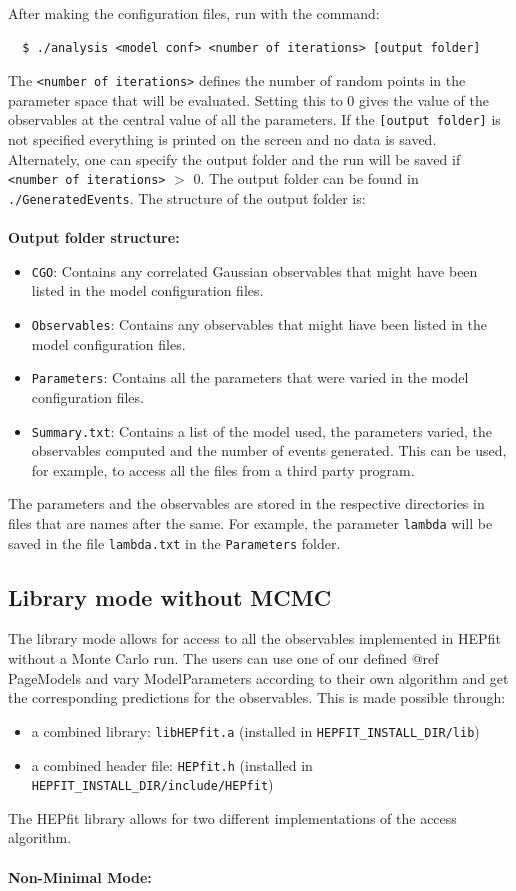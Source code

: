 \documentclass[preprint,3p,12pt]{elsarticle}
\begin{document}
{After making the configuration files, run with the command:
\begin{lstlisting}
  $ ./analysis <model conf> <number of iterations> [output folder]
\end{lstlisting}

The \texttt{<number of iterations>} defines the number of random points in the parameter space that will be evaluated. Setting this to 0 gives the value of the observables at the central value of all the parameters. If the \texttt{[output folder]} is not specified everything is printed on the screen and no data is saved. Alternately, one can specify the output folder and the run will be saved if \texttt{<number of iterations>} $>$ 0. The output folder can be found in \texttt{./GeneratedEvents}. The structure of the output folder is:\\\\
%
{\bf Output folder structure:}
\begin{itemize}
\item \texttt{CGO}: Contains any correlated Gaussian observables that might have been listed in the model configuration files.
\item \texttt{Observables}: Contains any observables that might have been listed in the model configuration files.
\item \texttt{Parameters}: Contains all the parameters that were varied in the model configuration files.
\item \texttt{Summary.txt}: Contains a list of the model used, the parameters varied, the observables computed and the number of events generated. This can be used, for example, to access all the files from a third party program.
\end{itemize}
The parameters and the observables are stored in the respective directories in files that are names after the same. For example, the parameter \texttt{lambda} will be saved in the file \texttt{lambda.txt} in the \texttt{Parameters} folder.


%
\subsection{Library mode without MCMC}
\label{sec:MC}
The library mode allows for access to all the observables implemented in HEPfit
without a Monte Carlo run. The users can use one of our defined @ref PageModels and vary ModelParameters
according to their own algorithm and get the corresponding predictions for the observables. This is made possible through:
\begin{itemize}
\item a combined library: \texttt{libHEPfit.a} (installed in \texttt{HEPFIT\_INSTALL\_DIR/lib})
\item a combined header file: \texttt{HEPfit.h} (installed in \texttt{HEPFIT\_INSTALL\_DIR/include/HEPfit})
\end{itemize}
The HEPfit library allows for two different implementations of the access algorithm.\\\\
%
{\bf Non-Minimal Mode:}

}
\end{document}
